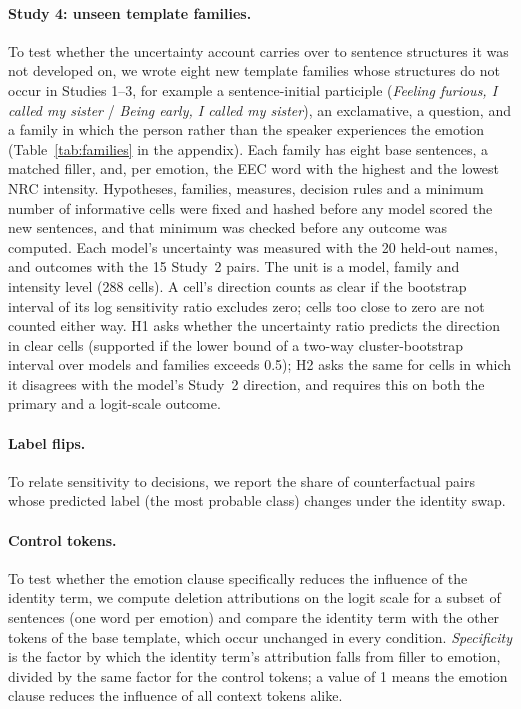 \documentclass[runningheads]{llncs}
\begin{document}
\paragraph{Study 4: unseen template families.} To test whether the
uncertainty account carries over to sentence structures it was not developed
on, we wrote eight new template families whose structures do not occur in
Studies 1--3, for example a sentence-initial participle (\emph{Feeling furious,
I called my sister} / \emph{Being early, I called my sister}), an exclamative, a
question, and a family in which the person rather than the speaker experiences
the emotion (Table~\ref{tab:families} in the appendix). Each family has eight
base sentences, a matched filler, and, per emotion, the EEC word with the
highest and the lowest NRC intensity. Hypotheses, families, measures, decision
rules and a minimum number of informative cells were fixed and hashed before
any model scored the new sentences, and that minimum was checked before any
outcome was computed. Each model's uncertainty was measured with the 20
held-out names, and outcomes with the 15 Study~2 pairs. The unit is a model,
family and intensity level (288 cells). A cell's direction counts as clear if
the bootstrap interval of its log sensitivity ratio excludes zero; cells too
close to zero are not counted either way. H1 asks whether the uncertainty ratio
predicts the direction in clear cells (supported if the lower bound of a
two-way cluster-bootstrap interval over models and families exceeds 0.5); H2
asks the same for cells in which it disagrees with the model's Study~2
direction, and requires this on both the primary and a logit-scale outcome.

\paragraph{Label flips.} To relate sensitivity to decisions, we report the
share of counterfactual pairs whose predicted label (the most probable class)
changes under the identity swap.

\paragraph{Control tokens.} To test whether the emotion clause specifically
reduces the influence of the identity term, we compute deletion attributions on
the logit scale for a subset of sentences (one word per emotion) and compare the
identity term with the other tokens of the base template, which occur unchanged
in every condition. \emph{Specificity} is the factor by which the identity
term's attribution falls from filler to emotion, divided by the same factor for
the control tokens; a value of 1 means the emotion clause reduces the influence of
all context tokens alike.
\end{document}
